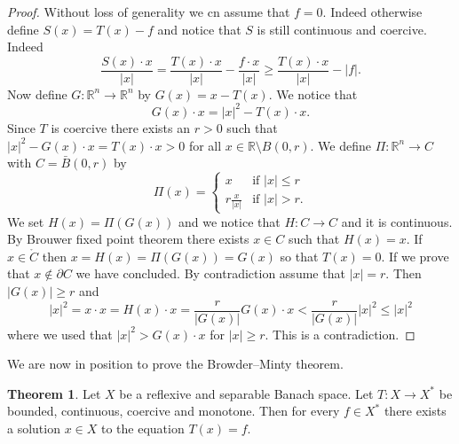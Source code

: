 \documentclass[a4paper,10pt,twoside]{amsbook}
\numberwithin{section}{chapter}
\numberwithin{equation}{chapter}
\theoremstyle{definition}
\newtheorem{thm}[prop]{Theorem}
\begin{document}
\begin{proof}
Without loss of generality we cn assume that $f=0$. Indeed otherwise define $S(x)=T(x)-f$ and notice that $S$ is still continuous and coercive. Indeed
\[
\frac{S(x)\cdot x}{|x|}=\frac{T(x)\cdot x}{|x|}-\frac{f\cdot x}{|x|}\ge\frac{T(x)\cdot x}{|x|}-|f|.
\]
Now define $G\colon\mathbb{R}^n\to\mathbb{R}^n$ by $G(x)=x-T(x)$. We notice that
\[
G(x)\cdot x=|x|^2-T(x)\cdot x.
\]
Since $T$ is coercive there exists an $r>0$ such that $|x|^2-G(x)\cdot x=T(x)\cdot x>0$ for all $x\in\mathbb{R}\setminus B(0,r)$. We define $\Pi\colon\mathbb{R}^n\to C$ with $C=\bar{B}(0,r)$ by
\[
\Pi(x)=
\begin{cases}
x & \text{if $|x|\le r$} \\
r\frac{x}{|x|} & \text{if $|x|>r$}.
\end{cases}
\]
We set $H(x)=\Pi(G(x))$ and we notice that $H\colon C\to C$ and it is continuous. By Brouwer fixed point theorem there exists $x\in C$ such that $H(x)=x$. If $x\in\mathring{C}$ then $x=H(x)=\Pi(G(x))=G(x)$ so that $T(x)=0$. If we prove that $x\notin\partial C$ we have concluded. By contradiction assume that $|x|=r$. Then $|G(x)|\ge r$ and
\[
|x|^2=x\cdot x=H(x)\cdot x=\frac{r}{|G(x)|}G(x)\cdot x<\frac{r}{|G(x)|}|x|^2\le|x|^2
\]
where we used that $|x|^2>G(x)\cdot x$ for $|x|\ge r$. This is a contradiction.
\end{proof}
We are now in position to prove the Browder--Minty theorem.
\begin{thm}
\label{thm:browder-minty}
Let $X$ be a reflexive and separable Banach space. Let $T\colon X\to X^*$ be bounded, continuous, coercive and monotone. Then for every $f\in X^*$ there exists a solution $x\in X$ to the equation $T(x)=f$.
\end{thm}
\end{document}
